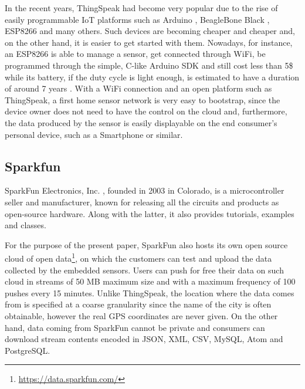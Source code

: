 In the recent years, ThingSpeak had become very popular due to the rise of easily programmable IoT platforms such as Arduino \cite{arduino}, BeagleBone Black \cite{bbblack}, ESP8266 \cite{esp8266} and many others.
Such devices are becoming cheaper and cheaper and, on the other hand, it is easier to get started with them.
Nowadays, for instance, an ESP8266 is able to manage a sensor, get connected through WiFi, be programmed through the simple, C-like Arduino SDK and still cost less than 5\$ while its battery, if the duty cycle is light enough, is estimated to have a duration of around 7 years \cite{di2015design}.
With a WiFi connection and an open platform such as ThingSpeak, a first home sensor network is very easy to bootstrap, since the device owner does not need to have the control on the cloud and, furthermore, the data produced by the sensor is easily displayable on the end consumer's personal device, such as a Smartphone or similar.

\subsection{Sparkfun}
SparkFun Electronics, Inc. \cite{sparkfun}, founded in 2003 in Colorado, is a microcontroller seller and manufacturer, known for releasing all the circuits and products as open-source hardware.
Along with the latter, it also provides tutorials, examples and classes.

For the purpose of the present paper, SparkFun also hosts its own open source cloud of open data\footnote{\url{https://data.sparkfun.com/}}, on which the customers can test and upload the data collected by the embedded sensors. %
Users can push for free their data on such cloud in streams of 50 MB maximum size and with a maximum frequency of 100 pushes every 15 minutes.
Unlike ThingSpeak, the location where the data comes from is specified at a coarse granularity since the name of the city is often obtainable, however the real GPS coordinates are never given.
On the other hand, data coming from SparkFun cannot be private and consumers can download stream contents encoded in JSON, XML, CSV, MySQL, Atom and PostgreSQL.